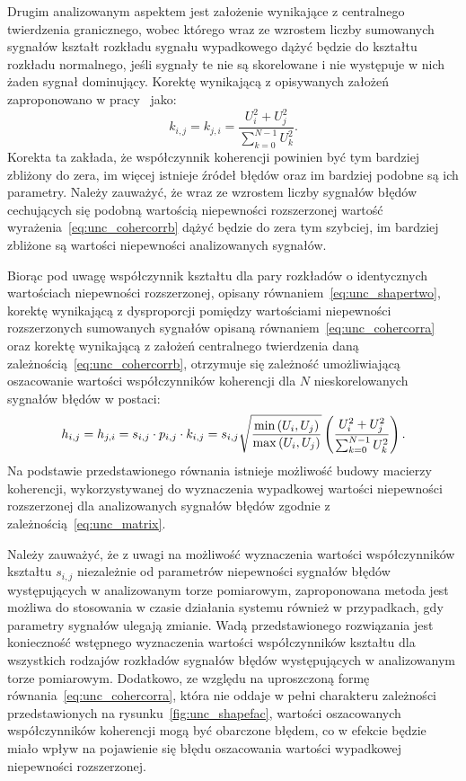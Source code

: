 Drugim analizowanym aspektem jest założenie wynikające z centralnego twierdzenia granicznego, wobec którego wraz ze wzrostem liczby sumowanych sygnałów kształt rozkładu sygnału wypadkowego dążyć będzie do kształtu rozkładu normalnego, jeśli sygnały te nie są skorelowane i nie występuje w nich żaden sygnał dominujący. Korektę wynikającą z opisywanych założeń zaproponowano w pracy~\cite{jakubiec_system} jako:
\begin{equation}
k_{i,j} = k_{j,i} = \frac{U_{i}^{2} + U_{j}^{2}}{\sum _{k = 0} ^{N-1} U_{k}^{2}} \label{eq:unc_cohercorrb}.
\end{equation}
Korekta ta zakłada, że współczynnik koherencji powinien być tym bardziej zbliżony do zera, im więcej istnieje źródeł błędów oraz im bardziej podobne są ich parametry. Należy zauważyć, że wraz ze wzrostem liczby sygnałów błędów cechujących się podobną wartością niepewności rozszerzonej wartość wyrażenia~\eqref{eq:unc_cohercorrb} dążyć będzie do zera tym szybciej, im bardziej zbliżone są wartości niepewności analizowanych sygnałów.

Biorąc pod uwagę współczynnik kształtu dla pary rozkładów o identycznych wartościach niepewności rozszerzonej, opisany równaniem~\eqref{eq:unc_shapertwo}, korektę wynikającą z dysproporcji pomiędzy wartościami niepewności rozszerzonych sumowanych sygnałów opisaną równaniem~\eqref{eq:unc_cohercorra} oraz korektę wynikającą z założeń centralnego twierdzenia daną zależnością~\eqref{eq:unc_cohercorrb}, otrzymuje się zależność umożliwiającą oszacowanie wartości współczynników koherencji dla $N$ nieskorelowanych sygnałów błędów w postaci:
\begin{equation}
h_{i,j} = h_{j,i} = s_{i,j} \cdot p_{i,j} \cdot k_{i,j} = s_{i,j} \sqrt{\frac{\min \left(U_{i}, U_{j}\right)}{\max \left(U_{i}, U_{j}\right)}} \left( \frac{U_{i}^{2} + U_{j}^{2}}{\sum _{k = 0} ^{N-1} U_{k}^{2}} \right) \label{eq:unc_coher}.
\end{equation}
Na podstawie przedstawionego równania istnieje możliwość budowy macierzy koherencji, wykorzystywanej do wyznaczenia wypadkowej wartości niepewności rozszerzonej dla analizowanych sygnałów błędów zgodnie z zależnością~\eqref{eq:unc_matrix}.

Należy zauważyć, że z uwagi na możliwość wyznaczenia wartości współczynników kształtu $s_{i,j}$ niezależnie od parametrów niepewności sygnałów błędów występujących w analizowanym torze pomiarowym, zaproponowana metoda jest możliwa do stosowania w czasie działania systemu również w przypadkach, gdy parametry sygnałów ulegają zmianie. Wadą przedstawionego rozwiązania jest konieczność wstępnego wyznaczenia wartości współczynników kształtu dla wszystkich rodzajów rozkładów sygnałów błędów występujących w analizowanym torze pomiarowym. Dodatkowo, ze względu na uproszczoną formę równania~\eqref{eq:unc_cohercorra}, która nie oddaje w pełni charakteru zależności przedstawionych na rysunku~\ref{fig:unc_shapefac}, wartości oszacowanych współczynników koherencji mogą być obarczone błędem, co w efekcie będzie miało wpływ na pojawienie się błędu oszacowania wartości wypadkowej niepewności rozszerzonej.


